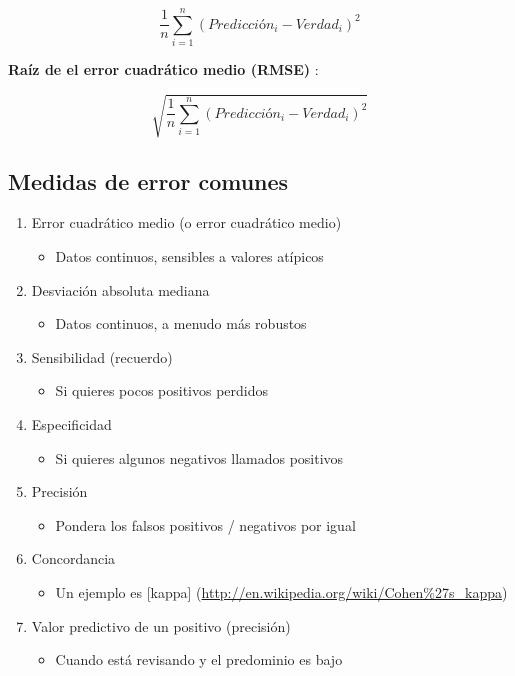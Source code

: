 \documentclass[
]{article}
\providecommand{\tightlist}{%
  \setlength{\itemsep}{0pt}\setlength{\parskip}{0pt}}
\begin{document}
\[\frac{1}{n}\sum_{i = 1}^n(Predicción_i-Verdad_i)^2\]

\textbf{Raíz de el error cuadrático medio (RMSE) }:

\[\sqrt{\frac{1}{n}\sum_{i = 1}^n (Predicción_i - Verdad_i) ^ 2}\]

\hypertarget{medidas-de-error-comunes}{%
\subsection{Medidas de error comunes}\label{medidas-de-error-comunes}}

\begin{enumerate}
\def\labelenumi{\arabic{enumi}.}
\tightlist
\item
  Error cuadrático medio (o error cuadrático medio)

  \begin{itemize}
  \tightlist
  \item
    Datos continuos, sensibles a valores atípicos
  \end{itemize}
\item
  Desviación absoluta mediana

  \begin{itemize}
  \tightlist
  \item
    Datos continuos, a menudo más robustos
  \end{itemize}
\item
  Sensibilidad (recuerdo)

  \begin{itemize}
  \tightlist
  \item
    Si quieres pocos positivos perdidos
  \end{itemize}
\item
  Especificidad

  \begin{itemize}
  \tightlist
  \item
    Si quieres algunos negativos llamados positivos
  \end{itemize}
\item
  Precisión

  \begin{itemize}
  \tightlist
  \item
    Pondera los falsos positivos / negativos por igual
  \end{itemize}
\item
  Concordancia

  \begin{itemize}
  \tightlist
  \item
    Un ejemplo es {[}kappa{]}
    (\url{http://en.wikipedia.org/wiki/Cohen\%27s_kappa})
  \end{itemize}
\item
  Valor predictivo de un positivo (precisión)

  \begin{itemize}
  \tightlist
  \item
    Cuando está revisando y el predominio es bajo
  \end{itemize}
\end{enumerate}
\end{document}
